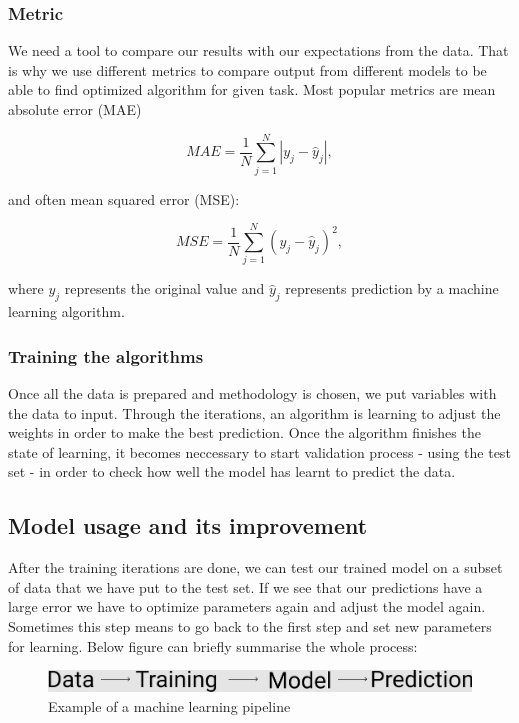 \documentclass[a4paper,oneside,openright,11pt]{book}
\begin{document}
\subsubsection{Metric}

We need a tool to compare our results with our expectations from the data. That is why we use different metrics to compare output from different models to be able to find optimized algorithm for given task. Most popular metrics are mean absolute error (MAE)

\begin{equation}
    MAE = \frac{1}{N}\sum_{j=1}^{N}|y_{j} - \hat{y}_{j}|,
\end{equation}

and often mean squared error (MSE):


\begin{equation}
    MSE = \frac{1}{N}\sum_{j=1}^{N}(y_{j} - \hat{y}_{j})^{2},
\end{equation}


\noindent
where $y_j$ represents the original value and $\hat{y}_j$ represents prediction by a machine learning algorithm.


\subsubsection{Training the algorithms}

Once all the data is prepared and methodology is chosen, we put variables with the data to input. Through the iterations, an algorithm is learning to adjust the weights in order to make the best prediction. Once the algorithm finishes the state of learning, it becomes neccessary to start validation process - using the test set - in order to check how well the model has learnt to predict the data.



\subsection{Model usage and its improvement}

After the training iterations are done, we can test our trained model on a subset of data that we have put to the test set. If we see that our predictions have a large error we have to optimize parameters again and adjust the model again. Sometimes this step means to go back to the first step and set new parameters for learning. Below figure can briefly summarise the whole process:

\begin{figure}[h]
\centering
\includegraphics[scale=0.5]{DocumentFigures/MyFigures/strzalkiver.png}
\caption{Example of a machine learning pipeline \cite{MLpipeline} }
\end{figure}
\end{document}
